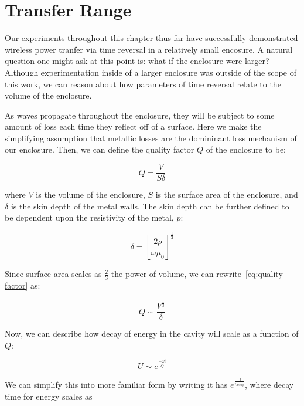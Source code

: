 \section{Transfer Range}
\label{sec:linear-transfer-range}

Our experiments throughout this chapter thus far have successfully demonstrated wireless power tranfer via time reversal in a relatively small encosure. A natural question one might ask at this point is: what if the enclosure were larger? Although experimentation inside of a larger enclosure was outside of the scope of this work, we can reason about how parameters of time reversal relate to the volume of the enclosure.

As waves propagate throughout the enclosure, they will be subject to some amount of loss each time they reflect off of a surface. Here we make the simplifying assumption that metallic losses are the domininant loss mechanism of our enclosure. Then, we can define the quality factor $Q$ of the enclosure to be:

\begin{equation}
Q = \frac{V}{S\delta}
\label{eq:quality-factor}
\end{equation}

where $V$ is the volume of the enclosure, $S$ is the surface area of the enclosure, and $\delta$ is the skin depth of the metal walls. The skin depth can be further defined to be dependent upon the resistivity of the metal, $p$:

\begin{equation}
\delta = {\left[\frac{2\rho}{\omega\mu_0}\right]}^{\frac{1}{2}}
\label{eq:skin-depth}
\end{equation}

Since surface area scales as $\frac{2}{3}$ the power of volume, we can rewrite~\ref{eq:quality-factor} as:

\begin{equation}
Q \sim \frac{V^{\frac{1}{3}}}{\delta}
\label{eq:surface-volume}
\end{equation}

Now, we can describe how decay of energy in the cavity will scale as a function of $Q$:

\begin{equation}
U \sim e^{\frac{-\omega t}{Q}}
\label{eq:u}
\end{equation}

We can simplify this into more familiar form by writing it has $e^{\frac{-t}{\tau_{decay}}}$, where decay time for energy scales as

